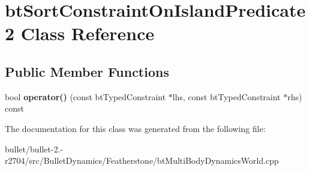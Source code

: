 \hypertarget{classbt_sort_constraint_on_island_predicate2}{\section{bt\+Sort\+Constraint\+On\+Island\+Predicate2 Class Reference}
\label{classbt_sort_constraint_on_island_predicate2}
}
\subsection*{Public Member Functions}
\begin{DoxyCompactItemize}
\item 
\hypertarget{classbt_sort_constraint_on_island_predicate2_a1d706e48a0946d38f9eb704837eccd63}{bool {\bfseries operator()} (const bt\+Typed\+Constraint $\ast$lhs, const bt\+Typed\+Constraint $\ast$rhs) const }\label{classbt_sort_constraint_on_island_predicate2_a1d706e48a0946d38f9eb704837eccd63}

\end{DoxyCompactItemize}


The documentation for this class was generated from the following file\+:\begin{DoxyCompactItemize}
\item 
bullet/bullet-\/2.-\/r2704/src/\+Bullet\+Dynamics/\+Featherstone/bt\+Multi\+Body\+Dynamics\+World.\+cpp\end{DoxyCompactItemize}
